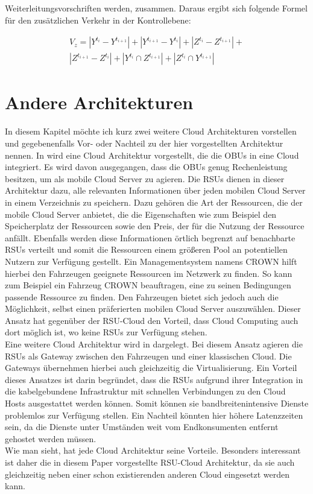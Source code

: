 \documentclass[conference]{IEEEtran}
\begin{document}
Weiterleitungsvorschriften werden, zusammen. Daraus ergibt sich folgende Formel für den zusätzlichen Verkehr in der Kontrollebene: 

\begin{equation}
\begin{split}
 V_z = |Y^{t_i}-Y^{t_{i+1}}|+|Y^{t_{i+1}}-Y^{t_{i}}|+|Z^{t_i}-Z^{t_{i+1}}|+ \\|Z^{t_{i+1}}-Z^{t_{i}}|+|Y^{t_i} \cap Z^{t_{i+1}}|+|Z^{t_{i}} \cap Y^{t_{i+1}}|
 \end{split}
\end{equation}


\section{Andere Architekturen}

In diesem Kapitel möchte ich kurz zwei weitere Cloud Architekturen vorstellen und gegebenenfalls Vor- oder Nachteil zu der hier vorgestellten Architektur nennen. In \cite{IEEEhowto:star} wird eine Cloud Architektur vorgestellt, die die OBUs in eine Cloud integriert. Es wird davon ausgegangen, dass die OBUs genug Rechenleistung besitzen, um als mobile Cloud Server zu agieren. Die RSUs dienen in dieser Architektur dazu, alle relevanten Informationen über jeden mobilen Cloud Server in einem Verzeichnis zu speichern. Dazu gehören die Art der Ressourcen, die der mobile Cloud Server anbietet, die die Eigenschaften wie zum Beispiel den Speicherplatz der Ressourcen sowie den Preis, der für die Nutzung der Ressource anfällt. Ebenfalls werden diese Informationen örtlich begrenzt auf benachbarte RSUs verteilt und somit die Ressourcen einem größeren Pool an potentiellen Nutzern zur Verfügung gestellt. Ein Managementsystem namens CROWN hilft hierbei den Fahrzeugen geeignete Ressourcen im Netzwerk zu finden. So kann zum Beispiel ein Fahrzeug CROWN beauftragen, eine zu seinen Bedingungen passende Ressource zu finden. Den Fahrzeugen bietet sich jedoch auch die Möglichkeit, selbst einen präferierten mobilen Cloud Server auszuwählen. Dieser Ansatz hat gegenüber der RSU-Cloud den Vorteil, dass Cloud Computing auch dort möglich ist, wo keine RSUs zur Verfügung stehen.\\
Eine weitere Cloud Architektur wird in \cite{IEEEhowto:rethinking} dargelegt. Bei diesem Ansatz agieren die RSUs als Gateway zwischen den Fahrzeugen und einer klassischen Cloud. Die Gateways übernehmen hierbei auch gleichzeitig die Virtualisierung. Ein Vorteil dieses Ansatzes ist darin begründet, dass die RSUs aufgrund ihrer Integration in die kabelgebundene Infrastruktur mit schnellen Verbindungen zu den Cloud Hosts ausgestattet werden können. Somit können sie bandbreitenintensive Dienste problemlos zur Verfügung stellen. Ein Nachteil könnten hier höhere Latenzzeiten sein, da die Dienste unter Umständen weit vom Endkonsumenten entfernt gehostet werden müssen.\\
Wie man sieht, hat jede Cloud Architektur seine Vorteile. Besonders interessant ist daher die in diesem Paper vorgestellte RSU-Cloud Architektur, da sie auch gleichzeitig neben einer schon existierenden anderen Cloud eingesetzt werden kann. 
\end{document}
